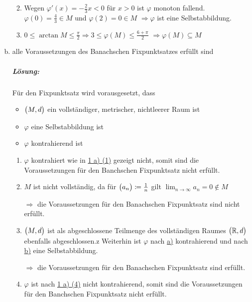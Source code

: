 \documentclass{scrreprt}
\begin{document}
\begin{enumerate}[a)]
\begin{enumerate}[(1)]
  \label{sec:1_b_3}
  \item Wegen $\varphi'(x) = -\frac{2}{3}x < 0$ für $x > 0$ ist $\varphi$ monoton fallend.
    $\varphi(0) = \frac{4}{3} \in M$ und $\varphi(2) = 0 \in M$
    $\Rightarrow \varphi$ ist eine Selbstabbildung.

  \item $0 \leq \arctan M \leq \frac{\pi}{2} \Rightarrow 3 \leq \varphi(M) \leq \frac{6 + \pi}{2}$
    $\Rightarrow \varphi(M) \subseteq M$
  \end{enumerate}

\newpage
\item alle Voraussetzungen des Banachschen Fixpunktsatzes erfüllt sind

  \subparagraph{Lösung:} Für den Fixpunktsatz wird vorausgesetzt, dass
  \begin{itemize}
  \item $\qty\big(M, d)$ ein vollständiger, metrischer, nichtleerer Raum ist
  \item $\varphi$ eine Selbstabbildung ist
  \item $\varphi$ kontrahierend ist
  \end{itemize}
  \begin{enumerate}[(1)]
  \item $\varphi$ kontrahiert wie in \hyperref[sec:1_a_1]{1 a) (1)} gezeigt nicht,
    somit sind die Voraussetzungen für den Banchschen Fixpunktsatz nicht erfüllt.

  \item $M$ ist nicht vollständig, da für $\qty\big(a_n) \coloneqq \frac{1}{n}$
    gilt $\lim_{n \to \infty} a_n = 0 \notin M$

    $\Rightarrow$ die Voraussetzungen für den Banachschen Fixpunktsatz sind nicht erfüllt.

  \item $\qty\big(M, d)$ ist als abgeschlossene Teilmenge des vollständigen Raumes
    $\qty\big(\mathbb{R}, d)$ ebenfalls abgeschlossen.z
    Weiterhin ist $\varphi$ nach \hyperref[sec:1_a_3]{a)} kontrahierend und nach
    \hyperref[sec:1_b_3]{b)} eine Selbstabbildung.

    $\Rightarrow$ die Voraussetzungen für den Banachschen Fixpunktsatz sind erfüllt.

  \item $\varphi$ ist nach \hyperref[sec:1_a_4]{1 a) (4)} nicht kontrahierend,
    somit sind die Voraussetzungen für den Banchschen Fixpunktsatz nicht erfüllt.
  \end{enumerate}


\end{enumerate}
\end{document}
